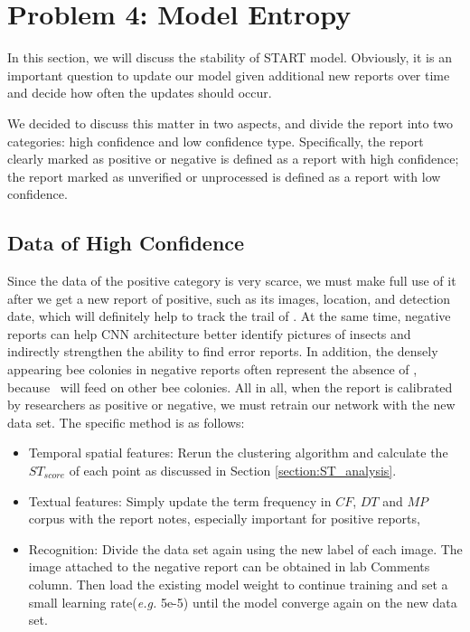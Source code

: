 \documentclass{mcmthesis}
\begin{document}
\section{Problem 4: Model Entropy}
In this section, we will discuss the stability of START model. Obviously, it is an important question to update our model given additional new reports over time and decide how often the updates should occur.

We decided to discuss this matter in two aspects, and divide the report into two categories: high confidence and low confidence type. Specifically, the report clearly marked as positive or negative is defined as a report with high confidence; the report marked as unverified or unprocessed is defined as a report with low confidence.

\subsection{Data of High Confidence}
\label{section:highconfdata}
Since the data of the positive category is very scarce, we must make full use of it after we get a new report of positive, such as its images, location, and detection date, which will definitely help to track the trail of \VM. At the same time, negative reports can help CNN architecture better identify pictures of insects and indirectly strengthen the ability to find error reports. In addition, the densely appearing bee colonies in negative reports often represent the absence of \VM, because \VM\ will feed on other bee colonies. All in all, when the report is calibrated by researchers as positive or negative, we must retrain our network with the new data set. The specific method is as follows:
\begin{itemize}
    \item {Temporal spatial features:} Rerun the clustering algorithm and calculate the $ST_{score}$ of each point as discussed in Section  \ref{section:ST_analysis}.
    
    \item {Textual features:} Simply update the term frequency in $CF$, $DT$ and $MP$ corpus with the report notes, especially important for positive reports,
    
    \item {Recognition:} Divide the data set again using the new label of each image. The image attached to the negative report can be obtained in lab Comments column. Then load the existing model weight to continue training and set a small learning rate(\emph{e.g.} 5e-5) until the model converge again on the new data set.
\end{itemize}
\end{document}
